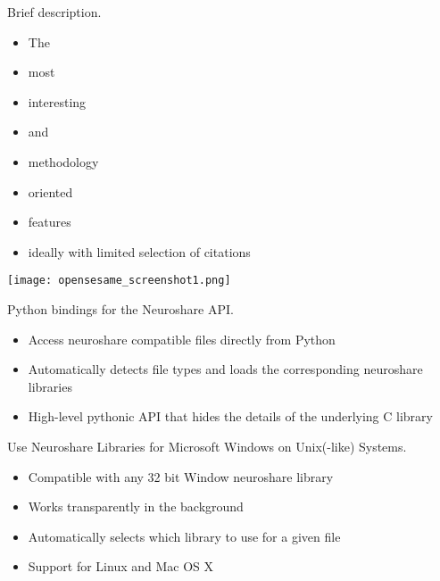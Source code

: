 \begin{multicols}{3}
Brief description.
\begin{itemize}[nolistsep,topsep=0em,leftmargin=1pc]
\item The
\item most
\item interesting
\item and
\item methodology
\item oriented
\item features
\item ideally with limited selection of citations
\end{itemize}
\texttt{[image: opensesame\_screenshot1.png]}



Python bindings for the Neuroshare API.

\begin{itemize}[nolistsep,topsep=0em,leftmargin=1pc]
\item Access neuroshare compatible files directly from Python
\item Automatically detects file types and loads the corresponding neuroshare libraries
\item High-level pythonic API that hides the details of the underlying C library
\end{itemize}


Use Neuroshare Libraries for Microsoft Windows on Unix(-like) Systems.

\begin{itemize}[nolistsep,topsep=0em,leftmargin=1pc]
\item Compatible with any 32 bit Window neuroshare library
\item Works transparently in the background
\item Automatically selects which library to use for a given file
\item Support for Linux and Mac OS X
\end{itemize}


\end{multicols}
